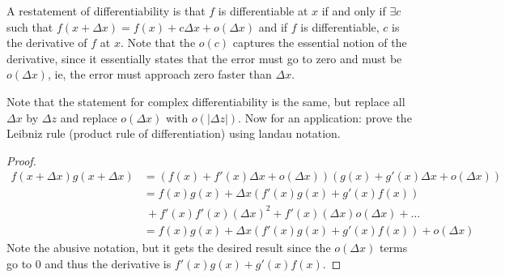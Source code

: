 \documentclass[11pt,leqno,oneside]{amsart}
\begin{document}
    \begin{defn}
        A restatement of differentiability is that $f$ is differentiable at $x$
        if and only if $\exists c$ such that $f(x+\Delta x) = f(x) + c \Delta x
        + o(\Delta x)$ and if $f$ is differentiable, $c$ is the derivative of
        $f$ at $x$. Note that the $o(c)$ captures the essential notion of the
        derivative, since it essentially states that the error must go to zero
        and must be $o(\Delta x)$, ie, the error must approach zero faster than
        $\Delta x$.
    \end{defn}
    Note that the statement for complex differentiability is the same, but
    replace all $\Delta x$ by $\Delta z$ and replace $o(\Delta x)$ with $o(|
    \Delta z|)$. Now for an application: prove the Leibniz rule (product rule
    of differentiation) using landau notation.
    \begin{proof}
        \begin{align*}
            f(x+\Delta x)g(x+\Delta x) & = (f(x)+f'(x)\Delta x + o(\Delta
            x))(g(x)+g'(x) \Delta x + o(\Delta x)) \\
            \ & = f(x)g(x) + \Delta x(f'(x)g(x)+g'(x)f(x)) \\
            \ & \ + f'(x)f'(x)(\Delta
            x)^2 + f'(x)(\Delta x)o(\Delta x) + \dots \\
            & = f(x)g(x) + \Delta x(f'(x)g(x) + g'(x)f(x)) + o(\Delta x)
        \end{align*}
        Note the abusive notation, but it gets the desired result since the
        $o(\Delta x)$ terms go to 0 and thus the derivative is
        $f'(x)g(x)+g'(x)f(x)$.
    \end{proof}
\end{document}

